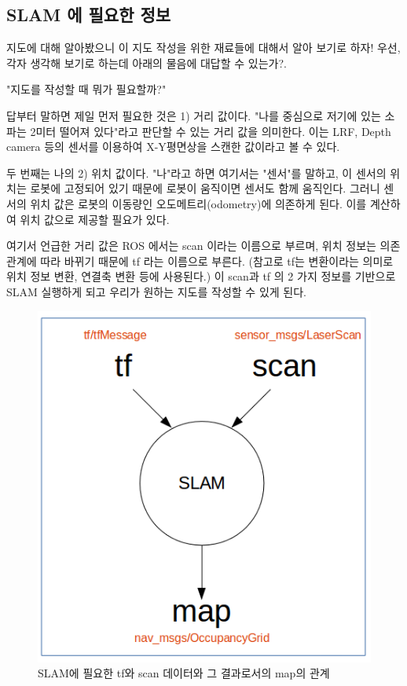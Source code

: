 \subsection{SLAM 에 필요한 정보}

지도에 대해 알아봤으니 이 지도 작성을 위한 재료들에 대해서 알아 보기로 하자! 우선, 각자 생각해 보기로 하는데 아래의 물음에 대답할 수 있는가?. 


"지도를 작성할 때 뭐가 필요할까?" 



답부터 말하면 제일 먼저 필요한 것은 1) 거리 값이다. "나를 중심으로 저기에 있는 소파는 2미터 떨어져 있다"라고 판단할 수 있는 거리 값을 의미한다. 이는 LRF, Depth camera 등의 센서를 이용하여 X-Y평면상을 스캔한 값이라고 볼 수 있다.

두 번째는 나의 2) 위치 값이다. "나"라고 하면 여기서는 "센서"를 말하고, 이 센서의 위치는 로봇에 고정되어 있기 때문에 로봇이 움직이면 센서도 함께 움직인다. 그러니 센서의 위치 값은 로봇의 이동량인 오도메트리(odometry)에 의존하게 된다. 이를 계산하여 위치 값으로 제공할 필요가 있다.

여기서 언급한 거리 값은 ROS 에서는 scan 이라는 이름으로 부르며, 위치 정보는 의존 관계에 따라 바뀌기 때문에 tf 라는 이름으로 부른다. (참고로 tf는 변환이라는 의미로 위치 정보 변환,  연결축 변환 등에 사용된다.) 이 scan과 tf 의 2 가지 정보를 기반으로 SLAM 실행하게 되고 우리가 원하는 지도를 작성할 수 있게 된다. 

\begin{figure}[h]
\centering
\includegraphics[width=0.7\columnwidth]{pictures/chapter11/tf_scan_slam_map.png}
\caption{SLAM에 필요한 tf와 scan 데이터와 그 결과로서의 map의 관계}
\end{figure}

